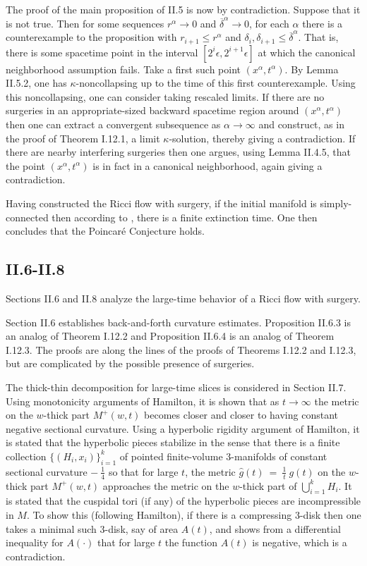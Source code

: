 \documentclass[12pt]{amsart}
\newcommand{\al}{\alpha}
\numberwithin{equation}{section}
\theoremstyle{plain}
\theoremstyle{definition}
\theoremstyle{remark}
\begin{document}
The proof of the main proposition of II.5 is now by contradiction.  Suppose
that it is not true.  Then for some sequences $r^\al \rightarrow 0$ and
$\overline{\delta}^\al \rightarrow 0$, for each $\al$ there is a counterexample to the
proposition with $r_{i+1} \le r^\al$ and $\delta_i, \delta_{i+1} \le 
\overline{\delta}^\al$. That is, there is some spacetime point in the interval
$\left[ 2^i \epsilon, 2^{i+1} \epsilon \right]$ at which the
canonical neighborhood assumption fails.  Take a first such point 
$(x^\al, t^\al)$.
By Lemma II.5.2, one has $\kappa$-noncollapsing up to the time of this
first counterexample. Using this noncollapsing, one can consider
taking rescaled limits.  If there are no surgeries in an
appropriate-sized backward spacetime region around $(x^\al, t^\al)$
then one can extract a convergent subsequence as $\al \rightarrow \infty$
and construct, as in the proof of Theorem I.12.1, a limit $\kappa$-solution,
thereby giving a contradiction. If there are nearby interfering surgeries
then one argues, using Lemma II.4.5, that the point $(x^\al, t^\al)$ is in fact in a
canonical neighborhood, again giving a contradiction.

Having constructed the Ricci flow with surgery, if the initial
manifold is simply-connected then according to
\cite{Colding-Minicozzi,Colding-Minicozzi2,Perelman3}, 
there is a finite extinction time.
One then concludes that the Poincar\'e Conjecture holds.


\subsection{II.6-II.8}

Sections II.6 and II.8 analyze the large-time behavior of a Ricci flow with
surgery.

Section II.6 establishes back-and-forth curvature estimates. Proposition
II.6.3 is an analog of Theorem I.12.2 and Proposition II.6.4 is an analog
of Theorem I.12.3.  The proofs are along the lines of the proofs of
Theorems I.12.2 and I.12.3, but are complicated by the possible presence
of surgeries.

The thick-thin decomposition for large-time slices is considered in
Section II.7. Using monotonicity arguments of Hamilton, it is
shown that as $t \rightarrow \infty$ the metric on the $w$-thick part $M^+(w,t)$
becomes closer and closer to having constant negative sectional
curvature. Using a hyperbolic rigidity argument of Hamilton, it is stated
that the hyperbolic pieces stabilize in the sense that
there is a finite collection $\{ (H_i, x_i) \}_{i=1}^k$ of
pointed finite-volume $3$-manifolds of constant sectional
curvature $- \: \frac14$ so that for large $t$, the metric
$\widehat{g}(t) \: = \: \frac{1}{t} \: g(t)$ on the $w$-thick part
$M^+(w,t)$ approaches the metric on the $w$-thick part
of $\bigcup_{i=1}^k H_i$. It is stated that the cuspidal tori (if any) of
the hyperbolic pieces  are incompressible in $M$. To show this
(following Hamilton), if there is a compressing $3$-disk then one
takes a minimal such $3$-disk, say of area $A(t)$, and shows from a
differential inequality for $A(\cdot)$ that for large $t$ the function
$A(t)$ is negative, which is a contradiction.
\end{document}
